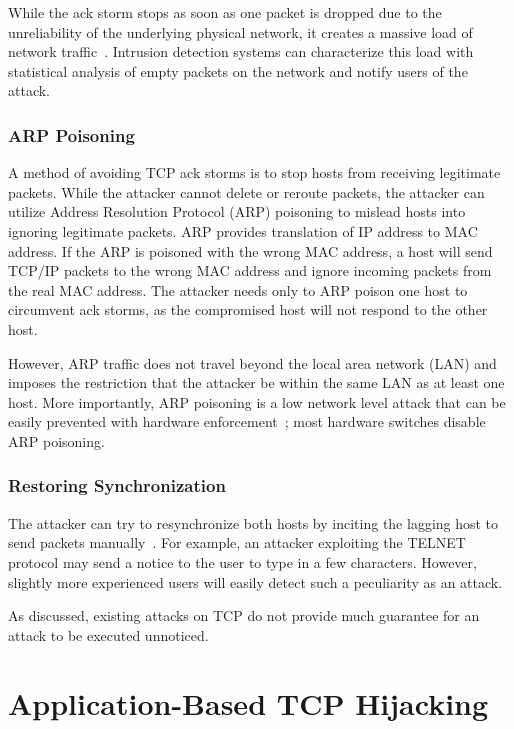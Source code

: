 \documentclass{sig-alternate}
\begin{document}
While the ack storm stops as soon as one packet is dropped due to the unreliability of the underlying physical network, it creates a massive load of network traffic~\cite{joncheray:simpleattack}.
Intrusion detection systems can characterize this load with statistical analysis of empty packets on the network and notify users of the attack.

\subsubsection{ARP Poisoning}

A method of avoiding TCP ack storms is to stop hosts from receiving legitimate packets.
While the attacker cannot delete or reroute packets, the attacker can utilize Address Resolution Protocol (ARP) poisoning to mislead hosts into ignoring legitimate packets.
ARP provides translation of IP address to MAC address.
If the ARP is poisoned with the wrong MAC address, a host will send TCP/IP packets to the wrong MAC address and ignore incoming packets from the real MAC address.
The attacker needs only to ARP poison one host to circumvent ack storms, as the compromised host will not respond to the other host.

However, ARP traffic does not travel beyond the local area network (LAN) and imposes the restriction that the attacker be within the same LAN as at least one host.
More importantly, ARP poisoning is a low network level attack that can be easily prevented with hardware enforcement~\cite{spangler:sniffing}; most hardware switches disable ARP poisoning.

\subsubsection{Restoring Synchronization}

The attacker can try to resynchronize both hosts by inciting the lagging host to send packets manually~\cite{lam:resync}.
For example, an attacker exploiting the TELNET protocol may send a notice to the user to type in a few characters.
However, slightly more experienced users will easily detect such a peculiarity as an attack.

As discussed, existing attacks on TCP do not provide much guarantee for an attack to be executed unnoticed.

\section{Application-Based TCP Hijacking}
\label{sec:abth}
\end{document}

